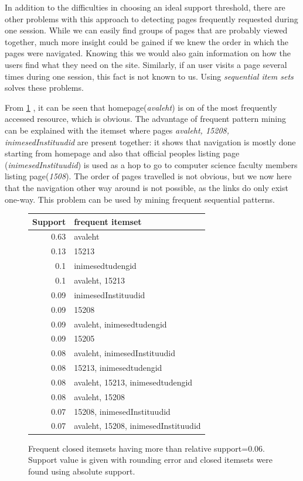 \documentclass[12pt, english,a4paper]{article}
\begin{document}
In addition to the difficulties in choosing an ideal support threshold, there are other problems with this approach to detecting pages frequently requested during one session. While we can easily find groups of pages that are probably viewed together, much more insight could be gained if we knew the order in which the pages were navigated. Knowing this we would also gain information on how the users find what they need on the site. Similarly, if an user visits a page several times during one session, this fact is not known to us. Using \emph{sequential item sets} solves these problems.

From \ref{frequent_patterns} , it can be seen that homepage(\emph{avaleht}) is on of the most frequently accessed resource, which is obvious. The advantage of frequent pattern mining can be explained with the itemset where pages \emph{avaleht, 15208, inimesedInstituudid} are present together: it shows that navigation is mostly done starting from homepage and also that official peoples listing page (\emph{inimesedInstituudid}) is used as a hop to go to computer science faculty members listing page(\emph{1508}).  The order of pages travelled is not obvious, but we now here that the navigation other way around is not possible, as the links do only exist one-way. This problem can be used by mining frequent sequential patterns.

\begin{figure}[H]
  \centering
\begin{tabular}{ r | l }
Support & frequent itemset \\ \hline
0.63 & avaleht \\ \hline
0.13 & 15213 \\ \hline
0.1 & inimesedtudengid \\ \hline
0.1 & avaleht, 15213 \\ \hline
0.09 & inimesedInstituudid \\ \hline
0.09 & 15208 \\ \hline
0.09 & avaleht, inimesedtudengid \\ \hline
0.09 & 15205 \\ \hline
0.08 & avaleht, inimesedInstituudid \\ \hline
0.08 & 15213, inimesedtudengid \\ \hline
0.08 & avaleht, 15213, inimesedtudengid \\ \hline
0.08 & avaleht, 15208 \\ \hline
0.07 & 15208, inimesedInstituudid \\ \hline
0.07 & avaleht, 15208, inimesedInstituudid \\ \hline
\end{tabular}
  \caption{Frequent closed itemsets having more than relative support=$0.06$. Support value is given with rounding error and closed itemsets were found using absolute support.}
  \label{frequent_patterns}
\end{figure}
\end{document}
